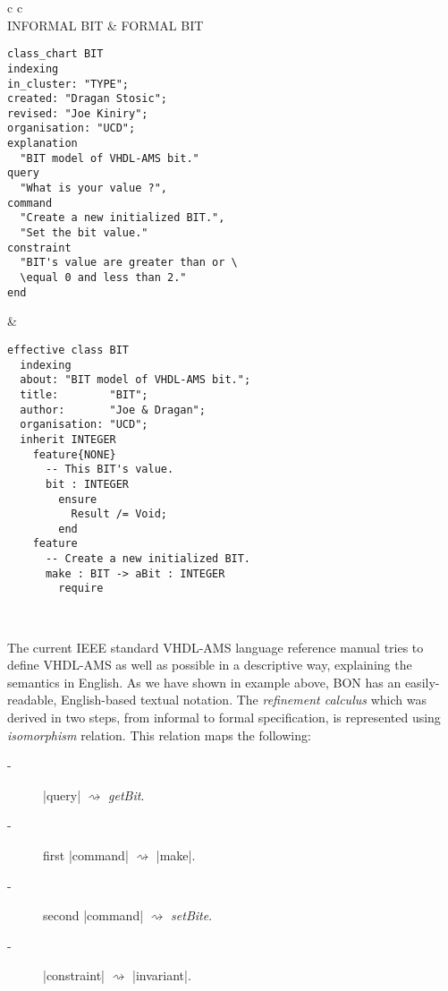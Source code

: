\begin{center}
\begin{tabular}{ c  c }
\\ 
INFORMAL BIT & FORMAL BIT \\ 
\begin{minipage}[l]{6.4cm} 
\begin{lstlisting}[language=Bon]
class_chart BIT
indexing
in_cluster: "TYPE";
created: "Dragan Stosic";
revised: "Joe Kiniry";
organisation: "UCD";
explanation
  "BIT model of VHDL-AMS bit."
query
  "What is your value ?",
command
  "Create a new initialized BIT.",
  "Set the bit value."
constraint
  "BIT's value are greater than or \
  \equal 0 and less than 2."
end
\end{lstlisting}

\end{minipage}  
&
\begin{minipage}[l]{6.6cm}
\begin{lstlisting}[language=Bon]
effective class BIT
  indexing
  about: "BIT model of VHDL-AMS bit.";
  title:        "BIT";
  author:       "Joe & Dragan";
  organisation: "UCD"; 
  inherit INTEGER
    feature{NONE}
      -- This BIT's value.
      bit : INTEGER 
        ensure
          Result /= Void;
        end
    feature
      -- Create a new initialized BIT.
      make : BIT -> aBit : INTEGER
        require   
\end{lstlisting}
\end{minipage}\\
\begin{minipage}[l]{6.4cm} 
The current IEEE standard VHDL-AMS language reference manual 
tries to define VHDL-AMS as well as possible in a descriptive way, 
explaining the semantics in English. As we have shown in example above,
BON has an easily-readable, English-based textual notation.
The \emph{refinement calculus} which was derived in two steps, 
from informal to formal specification, 
is represented using \emph{isomorphism} relation. 
This relation maps the following:
\begin{description}
\item[-] \lstinlinenb|query| $\rightsquigarrow$ \emph{getBit}.
\item[-] first \lstinlinenb|command| $\rightsquigarrow$ \lstinlinenb|make|.
\item[-] second \lstinlinenb|command| $\rightsquigarrow$ \emph{setBite}.
\item[-] \lstinlinenb|constraint| $\rightsquigarrow$ \lstinlinenb|invariant|.

\end{description}
\end{minipage}
\end{tabular}
\end{center}
